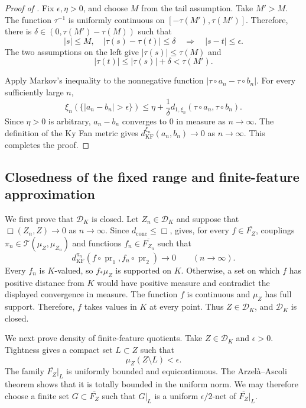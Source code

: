 \documentclass[10pt,a4paper]{amsart}
\newcommand{\DK}{\mathcal D_K}
\newcommand{\T}{\mathcal T}
\newcommand{\dconc}{d_{\mathrm{conc}}}
\newcommand{\kf}{d_{\operatorname{KF}}}
\DeclareMathOperator{\pr}{pr}
\begin{document}
\begin{proof}[Proof of ]
Fix $\epsilon,\eta>0$, and choose $M$ from the tail assumption. Take $M'>M$. The function $\tau^{-1}$ is uniformly continuous on $[-\tau(M'),\tau(M')]$. Therefore, there is $\delta\in(0,\tau(M')-\tau(M))$ such that
\[
|s|\leq M,\quad|\tau(s)-\tau(t)|\leq\delta
\quad\Longrightarrow\quad|s-t|\leq\epsilon.
\]
The two assumptions on the left give $|\tau(s)|\leq\tau(M)$ and
\[
|\tau(t)|\leq|\tau(s)|+\delta<\tau(M').
\]

Apply Markov's inequality \cite[proof of Proposition~1.2.6, p.~16]{bakry-gentil-ledoux2014markov} to the nonnegative function $|\tau\circ a_n-\tau\circ b_n|$. For every sufficiently large $n$,
\[
\xi_n(\{|a_n-b_n|>\epsilon\})
\leq\eta+\frac1\delta
d_{1,\xi_n}(\tau\circ a_n,\tau\circ b_n).
\]
Since $\eta>0$ is arbitrary, $a_n-b_n$ converges to $0$ in measure as $n\to\infty$. The definition of the Ky Fan metric gives $\kf^{\xi_n}(a_n,b_n)\to0$ as $n\to\infty$. This completes the proof.
\end{proof}

\subsection{Closedness of the fixed range and finite-feature approximation}
\label{subsec:app-screened-closed-density}

We first prove that $\DK$ is closed. Let $Z_n\in\DK$ and suppose that $\Box(Z_n,Z)\to0$ as $n\to\infty$. Since $\dconc\leq\Box$,  gives, for every $f\in\overline{F_Z}$, couplings $\pi_n\in\T(\mu_Z,\mu_{Z_n})$ and functions $f_n\in\overline{F_{Z_n}}$ such that
\[
\kf^{\pi_n}(f\circ\pr_1,f_n\circ\pr_2)\longrightarrow0
\qquad(n\to\infty).
\]
Every $f_n$ is $K$-valued, so $f_*\mu_Z$ is supported on $K$. Otherwise, a set on which $f$ has positive distance from $K$ would have positive measure and contradict the displayed convergence in measure. The function $f$ is continuous and $\mu_Z$ has full support. Therefore, $f$ takes values in $K$ at every point. Thus $Z\in\DK$, and $\DK$ is closed.

We next prove density of finite-feature quotients. Take $Z\in\DK$ and $\epsilon>0$. Tightness gives a compact set $L\subset Z$ such that
\[
\mu_Z(Z\setminus L)<\epsilon.
\]
The family $\overline{F_Z}|_L$ is uniformly bounded and equicontinuous. The Arzel\`a--Ascoli theorem \cite[7.15, p.~232]{kelley1955general} shows that it is totally bounded in the uniform norm. We may therefore choose a finite set $G\subset\overline{F_Z}$ such that $G|_L$ is a uniform $\epsilon/2$-net of $\overline{F_Z}|_L$.
\end{document}

